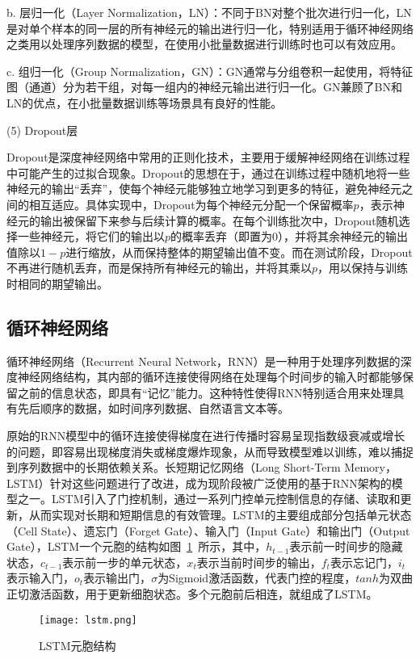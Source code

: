 b. 层归一化（Layer Normalization，LN）：不同于BN对整个批次进行归一化，LN是对单个样本的同一层的所有神经元的输出进行归一化，特别适用于循环神经网络之类用以处理序列数据的模型，在使用小批量数据进行训练时也可以有效应用。

c. 组归一化（Group Normalization，GN）：GN通常与分组卷积\cite{krizhevsky2017imagenet}一起使用，将特征图（通道）分为若干组，对每一组内的神经元输出进行归一化。GN兼顾了BN和LN的优点，在小批量数据训练等场景具有良好的性能。

(5) Dropout层

Dropout是深度神经网络中常用的正则化技术，主要用于缓解神经网络在训练过程中可能产生的过拟合现象。Dropout的思想在于，通过在训练过程中随机地将一些神经元的输出“丢弃”，使每个神经元能够独立地学习到更多的特征，避免神经元之间的相互适应。具体实现中，Dropout为每个神经元分配一个保留概率\(p\)，表示神经元的输出被保留下来参与后续计算的概率。在每个训练批次中，Dropout随机选择一些神经元，将它们的输出以\(p\)的概率丢弃（即置为0），并将其余神经元的输出值除以\(1-p\)进行缩放，从而保持整体的期望输出值不变。而在测试阶段，Dropout不再进行随机丢弃，而是保持所有神经元的输出，并将其乘以\(p\)，用以保持与训练时相同的期望输出。

\subsection{循环神经网络}

循环神经网络（Recurrent Neural Network，RNN）是一种用于处理序列数据的深度神经网络结构，其内部的循环连接使得网络在处理每个时间步的输入时都能够保留之前的信息状态，即具有“记忆”能力。这种特性使得RNN特别适合用来处理具有先后顺序的数据，如时间序列数据、自然语言文本等。

原始的RNN模型中的循环连接使得梯度在进行传播时容易呈现指数级衰减或增长的问题，即容易出现梯度消失或梯度爆炸现象，从而导致模型难以训练，难以捕捉到序列数据中的长期依赖关系。长短期记忆网络（Long Short-Term Memory，LSTM）针对这些问题进行了改进，成为现阶段被广泛使用的基于RNN架构的模型之一。LSTM引入了门控机制，通过一系列门控单元控制信息的存储、读取和更新，从而实现对长期和短期信息的有效管理。LSTM的主要组成部分包括单元状态（Cell State）、遗忘门（Forget Gate）、输入门（Input Gate）和输出门（Output Gate），LSTM一个元胞的结构如图~\ref{fig:lstm}~所示，其中，\(h_{t-1}\)表示前一时间步的隐藏状态，\(c_{t-1}\)表示前一步的单元状态，\(x_t\)表示当前时间步的输出，\(f_t\)表示忘记门，\(i_t\)表示输入门，\(o_t\)表示输出门，\(\sigma\)为Sigmoid激活函数，代表门控的程度，\(tanh\)为双曲正切激活函数，用于更新细胞状态。多个元胞前后相连，就组成了LSTM。
\begin{figure}
    \centering
    \texttt{[image: lstm.png]}
    \caption{LSTM元胞结构}
    \label{fig:lstm}
\end{figure}

